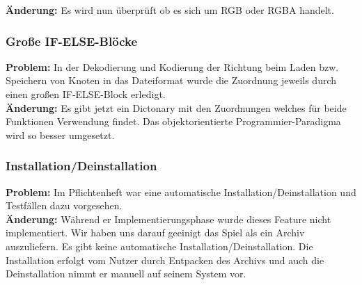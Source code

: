 \textbf{Änderung:} Es wird nun überprüft ob es sich um RGB oder RGBA handelt.\\



\subsubsection*{Große IF-ELSE-Blöcke}
\textbf{Problem:}
In der Dekodierung und Kodierung der Richtung beim Laden bzw. Speichern von Knoten in das Dateiformat wurde die Zuordnung jeweils durch einen großen IF-ELSE-Block erledigt.\\

\textbf{Änderung:} Es gibt jetzt ein Dictonary mit den Zuordnungen welches für beide Funktionen Verwendung findet. Das objektorientierte Programmier-Paradigma wird so besser umgesetzt.\\



\subsubsection*{Installation/Deinstallation}
\textbf{Problem:} Im Pflichtenheft war eine automatische Installation/Deinstallation und Testfällen dazu vorgesehen.\\

\textbf{Änderung:} Während er Implementierungsphase wurde dieses Feature nicht implementiert. Wir haben uns darauf geeinigt das Spiel als ein Archiv auszuliefern. Es gibt keine automatische Installation/Deinstallation. Die Installation erfolgt vom Nutzer durch Entpacken des Archivs und auch die Deinstallation nimmt er manuell auf seinem System vor.\\


